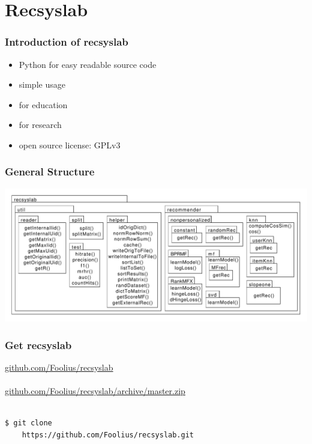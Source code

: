 \documentclass[mathserif]{beamer}
\begin{document}
\section{Recsyslab}
\begin{frame} 
\frametitle{Introduction of recsyslab} %
\begin{itemize}
    \item Python for easy readable source code
    \item simple usage
    \item for education
    \item for research
    \item open source license: GPLv3
\end{itemize}
\end{frame}
\begin{frame}
\frametitle{General Structure}
\begin{center}
    \includegraphics[page=1, scale=0.3]{packagediagram.pdf}
\end{center}
\end{frame}
\begin{frame}[fragile]
    \frametitle{Get recsyslab}
    \url{github.com/Foolius/recsyslab}\\
    \hspace*{8cm}\\
    \url{github.com/Foolius/recsyslab/archive/master.zip}\\
    \hspace*{8cm}\\
    \begin{lstlisting}[style=pseudocode]
$ git clone 
    https://github.com/Foolius/recsyslab.git
    \end{lstlisting}
\end{frame}
\end{document}
